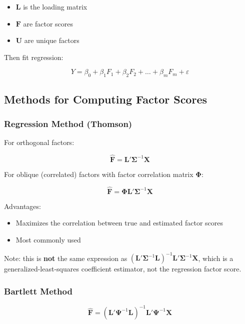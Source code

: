 \documentclass[
]{article}
\begin{document}
\begin{itemize}
\item
  \(\mathbf{L}\) is the loading matrix
\item
  \(\mathbf{F}\) are factor scores
\item
  \(\mathbf{U}\) are unique factors
\end{itemize}

Then fit regression:

\[Y = \beta_{0} + \beta_{1}F_{1} + \beta_{2}F_{2} + \ldots + \beta_{m}F_{m} + \varepsilon\]

\textbf{ }

\subsection{Methods for Computing Factor Scores}

\subsubsection{Regression Method (Thomson)}

For orthogonal factors:

\[\hat{\mathbf{F}} = \mathbf{L}'\mathbf{\Sigma}^{- 1}\mathbf{X}\]

For oblique (correlated) factors with factor correlation matrix
\(\mathbf{\Phi}\):

\[\hat{\mathbf{F}} = \mathbf{\Phi}\mathbf{L}'\mathbf{\Sigma}^{- 1}\mathbf{X}\]

Advantages:

\begin{itemize}
\item
  Maximizes the correlation between true and estimated factor scores
\item
  Most commonly used
\end{itemize}

Note: this is \textbf{not} the same expression as
\(\left( \mathbf{L}'\mathbf{\Sigma}^{- 1}\mathbf{L} \right)^{- 1}\mathbf{L}'\mathbf{\Sigma}^{- 1}\mathbf{X}\),
which is a generalized-least-squares coefficient estimator, not the
regression factor score.

\subsubsection{Bartlett Method}

\[\hat{\mathbf{F}} = \left( \mathbf{L}'\mathbf{\Psi}^{- 1}\mathbf{L} \right)^{- 1}\mathbf{L}'\mathbf{\Psi}^{- 1}\mathbf{X}\]
\end{document}
